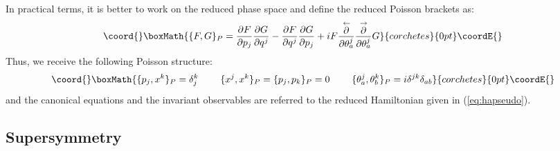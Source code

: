 \documentclass[a4paper,11pt,twoside]{article}
\begin{document}
In practical terms, it is better to work on the reduced phase
space and define the reduced Poisson brackets as:
\[\coord{}\boxMath{
\{F,G\}_P =\frac{\partial F}{\partial p_j}\frac{\partial
G}{\partial q^j}-\frac{\partial F}{\partial q^j} \frac{\partial
G}{\partial p_j}+i F
\frac{\stackrel{\leftarrow}{\partial}}{\partial \theta_a^j}
\frac{\stackrel{\rightarrow}{\partial}}{\partial \theta_a^j}G
}{corchetes}{0pt}\coordE{}\]
Thus, we receive the following Poisson structure:
\[\coord{}\boxMath{
\{p_j,x^k\}_P=\delta_j^k \hspace{0.8cm} \{x^j,x^k\}_P=\{p_j,p_k\}_P=0 \hspace{0.8cm}
\{\theta_a^j, \theta_b^k\}_P=i \delta^{jk} \delta_{a b}
}{corchetes}{0pt}\coordE{}\]
and the canonical equations and the invariant observables are
referred to the reduced Hamiltonian \coordHE{} given in (\ref{eq:hapseudo}).

\subsection{Supersymmetry}
\end{document}
